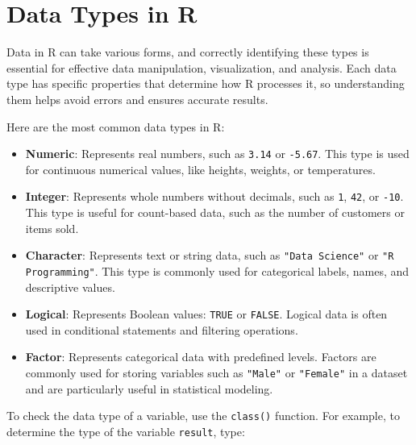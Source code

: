 \documentclass[
]{book}
\newcommand{\passthrough}[1]{#1}
\providecommand{\tightlist}{%
  \setlength{\itemsep}{0pt}\setlength{\parskip}{0pt}}
\theoremstyle{definition}
\theoremstyle{definition}
\theoremstyle{definition}
\theoremstyle{definition}
\theoremstyle{remark}
\begin{document}
\section{Data Types in R}\label{data-types-in-r}

Data in R can take various forms, and correctly identifying these types is essential for effective data manipulation, visualization, and analysis. Each data type has specific properties that determine how R processes it, so understanding them helps avoid errors and ensures accurate results.

Here are the most common data types in R:

\begin{itemize}
\tightlist
\item
  \textbf{Numeric}: Represents real numbers, such as \passthrough{\lstinline!3.14!} or \passthrough{\lstinline!-5.67!}. This type is used for continuous numerical values, like heights, weights, or temperatures.\\
\item
  \textbf{Integer}: Represents whole numbers without decimals, such as \passthrough{\lstinline!1!}, \passthrough{\lstinline!42!}, or \passthrough{\lstinline!-10!}. This type is useful for count-based data, such as the number of customers or items sold.\\
\item
  \textbf{Character}: Represents text or string data, such as \passthrough{\lstinline!"Data Science"!} or \passthrough{\lstinline!"R Programming"!}. This type is commonly used for categorical labels, names, and descriptive values.\\
\item
  \textbf{Logical}: Represents Boolean values: \passthrough{\lstinline!TRUE!} or \passthrough{\lstinline!FALSE!}. Logical data is often used in conditional statements and filtering operations.\\
\item
  \textbf{Factor}: Represents categorical data with predefined levels. Factors are commonly used for storing variables such as \passthrough{\lstinline!"Male"!} or \passthrough{\lstinline!"Female"!} in a dataset and are particularly useful in statistical modeling.
\end{itemize}

To check the data type of a variable, use the \passthrough{\lstinline!class()!} function. For example, to determine the type of the variable \passthrough{\lstinline!result!}, type:
\end{document}
